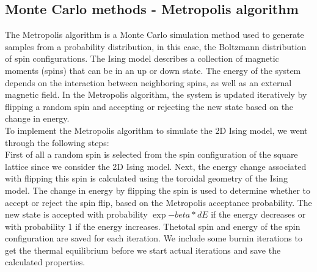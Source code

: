\documentclass[%
reprint,
 amsmath,amssymb,
 aps,
]{revtex4-2}
\begin{document}
\subsection{Monte Carlo methods - Metropolis algorithm}
The Metropolis algorithm is a Monte Carlo simulation method used to generate samples from a probability distribution, in this case, the Boltzmann distribution of spin configurations. The Ising model describes a collection of magnetic moments (spins) that can be in an up or down state. The energy of the system depends on the interaction between neighboring spins, as well as an external magnetic field. In the Metropolis algorithm, the system is updated iteratively by flipping a random spin and accepting or rejecting the new state based on the change in energy. \\
To implement the Metropolis algorithm to simulate the 2D Ising model, we went through the following steps: \\
First of all a random spin is selected from the spin configuration of the square lattice since we consider the 2D Ising model. 
Next, the energy change associated with flipping this spin is calculated using the toroidal geometry of the Ising model.  
The change in energy by flipping the spin is used to determine whether to accept or reject the spin flip, based on the Metropolis acceptance probability. The new state is accepted with probability $\exp{-beta*dE}$ if the energy decreases or with probability 1 if the energy increases. 
Thetotal spin and energy of the spin configuration are saved for each iteration. 
We include some burnin iterations to get the thermal equilibrium before we start actual iterations and save the calculated properties.   
\end{document}
